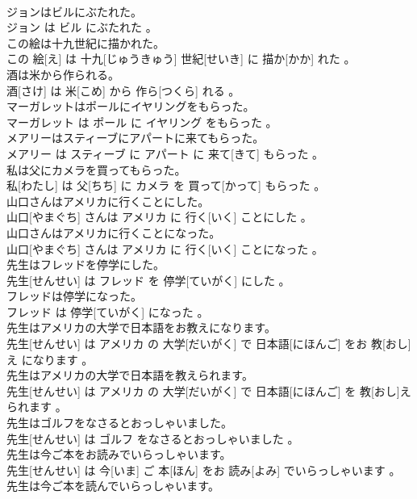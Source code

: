 \documentclass[8pt]{extreport}
\begin{document}
\begin{CJK}{UTF8}{min}
\\	ジョンはビルにぶたれた。	
\\	ジョン は ビル にぶたれた 。
\\	この絵は十九世紀に描かれた。	
\\	この 絵[え] は 十九[じゅうきゅう] 世紀[せいき] に 描か[かか] れた 。
\\	酒は米から作られる。	
\\	酒[さけ] は 米[こめ] から 作ら[つくら] れる 。
\\	マーガレットはポールにイヤリングをもらった。	
\\	マーガレット は ポール に イヤリング をもらった 。
\\	メアリーはスティーブにアパートに来てもらった。	
\\	メアリー は スティーブ に アパート に 来て[きて] もらった 。
\\	私は父にカメラを買ってもらった。	
\\	私[わたし] は 父[ちち] に カメラ を 買って[かって] もらった 。
\\	山口さんはアメリカに行くことにした。	
\\	山口[やまぐち] さんは アメリカ に 行く[いく] ことにした 。
\\	山口さんはアメリカに行くことになった。	
\\	山口[やまぐち] さんは アメリカ に 行く[いく] ことになった 。
\\	先生はフレッドを停学にした。	
\\	先生[せんせい] は フレッド を 停学[ていがく] にした 。
\\	フレッドは停学になった。	
\\	フレッド は 停学[ていがく] になった 。
\\	先生はアメリカの大学で日本語をお教えになります。	
\\	先生[せんせい] は アメリカ の 大学[だいがく] で 日本語[にほんご] をお 教[おし]え になります 。
\\	先生はアメリカの大学で日本語を教えられます。	
\\	先生[せんせい] は アメリカ の 大学[だいがく] で 日本語[にほんご] を 教[おし]え られます 。
\\	先生はゴルフをなさるとおっしゃいました。	
\\	先生[せんせい] は ゴルフ をなさるとおっしゃいました 。
\\	先生は今ご本をお読みでいらっしゃいます。	
\\	先生[せんせい] は 今[いま] ご 本[ほん] をお 読み[よみ] でいらっしゃいます 。
\\	先生は今ご本を読んでいらっしゃいます。	

\end{CJK}
\end{document}
